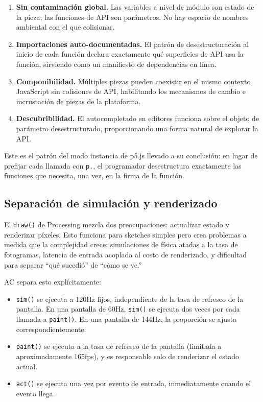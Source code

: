 \documentclass[10pt,letterpaper,twocolumn]{article}
\begin{document}
\begin{enumerate}
  \item \textbf{Sin contaminación global.} Las variables a nivel de módulo son estado de la pieza; las funciones de API son parámetros. No hay espacio de nombres ambiental con el que colisionar.
  \item \textbf{Importaciones auto-documentadas.} El patrón de desestructuración al inicio de cada función declara exactamente qué superficies de API usa la función, sirviendo como un manifiesto de dependencias en línea.
  \item \textbf{Componibilidad.} Múltiples piezas pueden coexistir en el mismo contexto JavaScript sin colisiones de API, habilitando los mecanismos de cambio e incrustación de piezas de la plataforma.
  \item \textbf{Descubribilidad.} El autocompletado en editores funciona sobre el objeto de parámetro desestructurado, proporcionando una forma natural de explorar la API.
\end{enumerate}

Este es el patrón del modo instancia de p5.js llevado a su conclusión: en lugar de prefijar cada llamada con \texttt{p.}, el programador desestructura exactamente las funciones que necesita, una vez, en la firma de la función.

\subsection{Separación de simulación y renderizado}
\label{sec:simsep}

El \texttt{draw()} de Processing mezcla dos preocupaciones: actualizar estado y renderizar píxeles. Esto funciona para sketches simples pero crea problemas a medida que la complejidad crece: simulaciones de física atadas a la tasa de fotogramas, latencia de entrada acoplada al costo de renderizado, y dificultad para separar ``qué sucedió'' de ``cómo se ve.''

AC separa esto explícitamente:

\begin{itemize}
  \item \texttt{sim()} se ejecuta a 120Hz fijos, independiente de la tasa de refresco de la pantalla. En una pantalla de 60Hz, \texttt{sim()} se ejecuta dos veces por cada llamada a \texttt{paint()}. En una pantalla de 144Hz, la proporción se ajusta correspondientemente.
  \item \texttt{paint()} se ejecuta a la tasa de refresco de la pantalla (limitada a aproximadamente 165fps), y es responsable solo de renderizar el estado actual.
  \item \texttt{act()} se ejecuta una vez por evento de entrada, inmediatamente cuando el evento llega.
\end{itemize}
\end{document}
